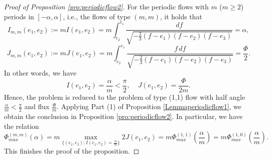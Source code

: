 \documentclass[reqno,12pt]{amsart}
\begin{document}
\begin{proof}[Proof of Proposition \ref{pro:periodicflow2}]
 For the periodic flows with $m$ ($m\geq 2$) periods in $[-\alpha, \alpha]$, i.e., the flows of type $(m, m)$, it holds that 
\begin{equation}
\label{eq1410}
I_{m, m}(e_1, e_2) := mI(e_1, e_2) =  m\int_{e_2}^{e_1}\frac{ df }{ \sqrt{-\frac23 (f- e_1)(f-e_2) (f-e_3)}} = \alpha, 
\end{equation}
\begin{equation}
\label{eq1414}
J_{m, m}(e_1, e_2) := mJ(e_1, e_2) = m \int_{e_2}^{e_1} \frac{ f\, df }{ \sqrt{-\frac23 (f- e_1)(f-e_2) (f-e_3)}}= \frac{\Phi}{2}. 
\end{equation}
In other words, we have
\begin{equation*}
    I(e_1, e_2) = \frac{\alpha}{m}<\frac{\pi}{2}, ~ ~~~~J(e_1, e_2) = \frac{\Phi}{2m}.
\end{equation*}
Hence, the problem is reduced to the problem of type (1,1) flow with half angle $\frac{\alpha}{m}<\frac{\pi}{2}$ and flux $\frac{\Phi}{m}$. Applying Part (1) of Proposition \ref{Lemmaperiodicflow1}, we obtain the conclusion in Proposition \ref{pro:periodicflow2}. In particular, we have 
the relation  
\begin{equation*}
   \Phi_{max}^{(m, m)}(\alpha) = m \max_{\{(e_1,e_2):  I(e_1,e_2)=\frac{\alpha}{m}\}}2J(e_1, e_2)= m\Phi_{max}^{(1, 1)}\left(\frac{\alpha}{m}\right)= m \Phi_{max}^{(1, 0)}\left(\frac{\alpha}{m}\right). 
\end{equation*}
This finishes the proof of the proposition.
\end{proof}



\end{document}

